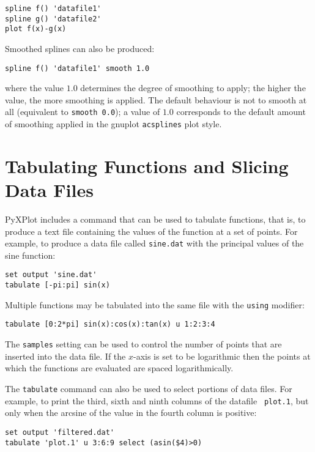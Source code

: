 \begin{verbatim}
spline f() 'datafile1'
spline g() 'datafile2'
plot f(x)-g(x)
\end{verbatim}

Smoothed splines can also be produced:

\begin{verbatim}
spline f() 'datafile1' smooth 1.0
\end{verbatim}

\noindent where the value $1.0$ determines the degree of smoothing to apply;
the higher the value, the more smoothing is applied. The default behaviour is
not to smooth at all (equivalent to \texttt{smooth 0.0}); a value of $1.0$
corresponds to the default amount of smoothing applied in the
gnuplot \texttt{acsplines} plot style.

\section{Tabulating Functions and Slicing Data Files}

PyXPlot includes a command that can be used to tabulate functions, that is, to
produce a text file containing the values of the function at a set of points.
For example, to produce a data file called {\tt sine.dat} with the principal
values of the sine function:

\begin{verbatim}
set output 'sine.dat'
tabulate [-pi:pi] sin(x)
\end{verbatim}

Multiple functions may be tabulated into the same file with the {\tt using}
modifier:

\begin{verbatim}
tabulate [0:2*pi] sin(x):cos(x):tan(x) u 1:2:3:4
\end{verbatim}

The {\tt samples} setting can be used to control the number of points that are
inserted into the data file.  If the $x$-axis is set to be logarithmic then the
points at which the functions are evaluated are spaced logarithmically.

The {\tt tabulate} command can also be used to select portions of data files.
For example, to print the third, sixth and ninth columns of the datafile {\tt
plot.1}, but only when the arcsine of the value in the fourth column is
positive:

\begin{verbatim}
set output 'filtered.dat'
tabulate 'plot.1' u 3:6:9 select (asin($4)>0)
\end{verbatim}

